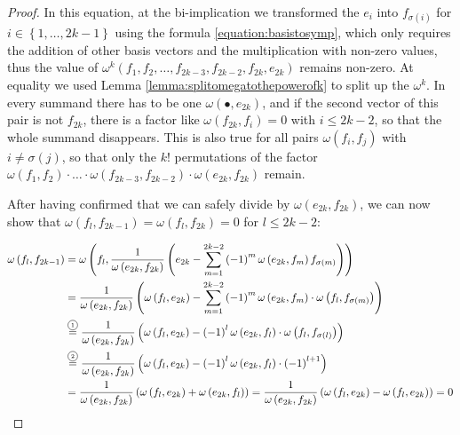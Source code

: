 \documentclass[../SymplecticSimplices.tex]{subfiles}
\begin{document}
\begin{proof}
  In this equation, at the bi-implication  we transformed the \( e_i \) into \( f_{\sigma \left( i \right)} \) for \( i \in \left\lbrace 1, \dots, 2k-1 \right\rbrace \) using the formula \eqref{equation:basistosymp}, which only requires the addition of other basis vectors and the multiplication with non-zero values, thus the value of \( \omega^{k} \left( f_1, f_2, \dots, f_{2k-3}, f_{2k-2}, f_{2k}, e_{2k} \right) \) remains non-zero. At equality  we used Lemma \ref{lemma:splitomegatothepowerofk} to split up the \( \omega^{k} \). In every summand there has to be one \( \omega \left( \bullet, e_{2k} \right) \), and if the second vector of this pair is not \( f_{2k} \), there is a factor like \( \omega \left( f_{2k}, f_i \right) = 0 \) with \( i \leq 2k - 2 \), so that the whole summand disappears. This is also true for all pairs \( \omega \left( f_i, f_j \right) \) with \( i \neq \sigma \left( j \right) \), so that only the \( k! \) permutations of the factor \( \omega \left( f_1, f_2 \right) \cdot \dots \cdot \omega \left( f_{2k-3}, f_{2k-2} \right) \cdot \omega \left( e_{2k}, f_{2k} \right) \) remain.

  After having confirmed that we can safely divide by \( \omega \left( e_{2k}, f_{2k} \right) \), we can now show that \( \omega \left( f_l, f_{2k-1} \right) = \omega \left( f_l, f_{2k} \right) = 0 \) for \( l \leq 2k-2 \):

  \begin{equation*}
    \begin{split}
      \omega \left( f_l, f_{2k-1} \right) & = \omega \left( f_l, \frac{1}{\omega \left( e_{2k}, f_{2k} \right)} \left( e_{2k} - \sum \limits _{m=1}^{2k-2} \left( -1 \right)^{m} \omega \left(e_{2k} , f_m \right) f_{\sigma \left( m \right)} \right) \right) \\ &
    = \frac{1}{\omega \left( e_{2k}, f_{2k} \right)} \left( \omega \left( f_l, e_{2k} \right) - \sum \limits _{m=1}^{2k-2} \left( -1 \right)^{m} \omega \left( e_{2k}, f_m \right) \cdot \omega \left( f_l, f_{\sigma \left( m \right)} \right) \right) \\ &
    \eqcom{1} \frac{1}{\omega \left( e_{2k}, f_{2k} \right)} \left( \omega \left( f_l, e_{2k} \right) - \left( -1 \right)^{l} \omega \left( e_{2k}, f_l \right) \cdot \omega \left( f_l, f_{\sigma \left( l \right)} \right) \right) \\ &
  \eqcom{2} \frac{1}{\omega \left( e_{2k}, f_{2k} \right)} \left( \omega \left( f_l, e_{2k} \right) - \left( -1 \right)^{l} \omega \left( e_{2k}, f_l \right) \cdot \left( -1 \right)^{l+1} \right) \\ &
  = \frac{1}{\omega \left( e_{2k}, f_{2k} \right)} \left( \omega \left( f_l, e_{2k} \right) + \omega \left( e_{2k}, f_l \right) \right) = \frac{1}{\omega \left( e_{2k}, f_{2k} \right)} \left( \omega \left( f_l, e_{2k} \right) - \omega \left( f_l, e_{2k} \right) \right) = 0
    \end{split}
  \end{equation*}


\end{proof}
\end{document}
